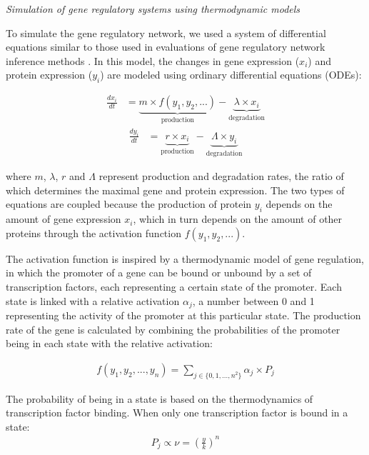 \hfill\break
\textit{Simulation of gene regulatory systems using thermodynamic models}
\hfill\break

To simulate the gene regulatory network, we used a system of differential equations similar to those used in evaluations of gene regulatory network inference methods \cite{marbach_wisdomcrowdsrobust_2012}. In this model, the changes in gene expression ($x_i$) and protein expression ($y_i$) are modeled using ordinary differential equations \cite{schaffter_genenetweaversilicobenchmark_2011} (ODEs):



$$
\begin{aligned}
\label{eq:mrna_ode}
\frac{dx_i}{dt} &= \underbrace{m \times f(y_1, y_2, ...)}_\text{production} - \underbrace{\lambda \times x_i}_\text{degradation}
\end{aligned}
$$
$$
\begin{aligned}
\label{eq:prot_ode}
\frac{dy_i}{dt} &= \underbrace{r \times x_i}_\text{production} - \underbrace{\Lambda \times y_i}_\text{degradation}
\end{aligned}
$$

where $m$, $\lambda$, $r$ and $\Lambda$ represent production and degradation rates, the ratio of which determines the maximal gene and protein expression. The two types of equations are coupled because the production of protein $y_i$ depends on the amount of gene expression $x_i$, which in turn depends on the amount of other proteins through the activation function $f(y_1, y_2, ...)$.

The activation function is inspired by a thermodynamic model of gene regulation, in which the promoter of a gene can be bound or unbound by a set of transcription factors, each representing a certain state of the promoter. Each state is linked with a relative activation $\alpha_j$, a number between 0 and 1 representing the activity of the promoter at this particular state. The production rate of the gene is calculated by combining the probabilities of the promoter being in each state with the relative activation:

$$
\begin{aligned}
\label{eq:input_function_probabilities}
f(y_1, y_2, ..., y_n) = \sum_{j \in \{0, 1, ..., n^2\}} \alpha_j \times P_j
\end{aligned}
$$

The probability of being in a state is based on the thermodynamics of transcription factor binding. When only one transcription factor is bound in a state:
$$
\begin{aligned}
P_j \propto \nu = \left(\frac{y}{k}\right)^{n}
\end{aligned}
$$

